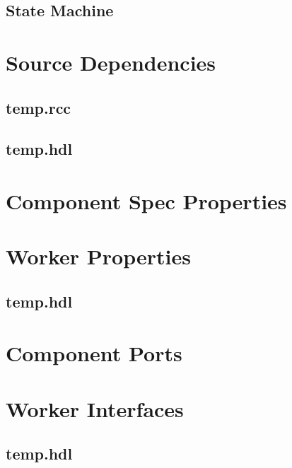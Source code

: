 \documentclass{article}
\def\comp{temp}
\begin{document}
\subsection*{State Machine}
\begin{flushleft}
\end{flushleft}

\section*{Source Dependencies}
\subsection*{\comp.rcc}
\subsection*{\comp.hdl}


\begin{landscape}
	\section*{Component Spec Properties}
	\begin{scriptsize}
	\end{scriptsize}

	\section*{Worker Properties}
	\subsection*{\comp.hdl}
	\begin{scriptsize}
	\end{scriptsize}

	\section*{Component Ports}
	\begin{scriptsize}
	\end{scriptsize}

	\section*{Worker Interfaces}
	\subsection*{\comp.hdl}
	\begin{scriptsize}
	\end{scriptsize}
\end{landscape}
\end{document}
